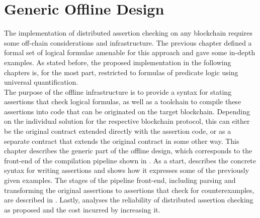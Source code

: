

\chapter{Generic Offline Design}\label{chap:offline}
The implementation of distributed assertion checking on any blockchain requires some off-chain considerations and infrastructure. The previous chapter defined a formal set of logical formulae amenable for this approach and gave some in-depth examples. As stated before, the proposed implementation in the following chapters is, for the most part, restricted to formulas of predicate logic using universal quantification.\\
The purpose of the offline infrastructure is to provide a syntax for stating assertions that check logical formulas, as well as a toolchain to compile these assertions into code that can be originated on the target blockchain. Depending on the individual solution for the respective blockchain protocol, this can either be the original contract extended directly with the assertion code, or as a separate contract that extends the original contract in some other way. This chapter describes the generic part of the offline design, which corresponds to the front-end of the compilation pipeline shown in . As a start,  describes the concrete syntax for writing assertions and shows how it expresses some of the previously given examples. The stages of the pipeline front-end, including parsing and transforming the original assertions to assertions that check for counterexamples, are described in . Lastly,  analyses the reliability of distributed assertion checking as proposed and the cost incurred by increasing it.

